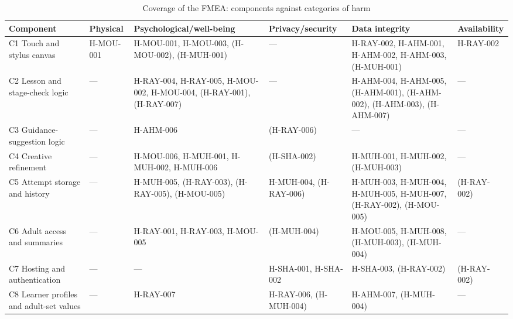 \documentclass{article}
\begin{document}
\begin{table}[htbp]
\centering
\caption{Coverage of the FMEA: components against categories of harm}
\label{tab:fmea-coverage}
\scriptsize
\setlength{\tabcolsep}{3pt}
\begin{tabularx}{\textwidth}{@{}
  >{\raggedright\arraybackslash}p{2.0cm} >{\raggedright\arraybackslash}X
  >{\raggedright\arraybackslash}X >{\raggedright\arraybackslash}X
  >{\raggedright\arraybackslash}X >{\raggedright\arraybackslash}X@{}}
\toprule
\textbf{Component} & \textbf{Physical} &
\textbf{Psycho\-logical/\allowbreak{}well-being} &
\textbf{Privacy/\allowbreak{}security} & \textbf{Data integrity} &
\textbf{Avail\-ability} \\
\midrule
C1 Touch and stylus canvas & H-MOU-001 & H-MOU-001, H-MOU-003, (H-MOU-002),
(H-MUH-001) & --- & H-RAY-002, H-AHM-001, H-AHM-002, H-AHM-003, (H-MUH-001) &
H-RAY-002 \\
\addlinespace
C2 Lesson and stage-check logic & --- & H-RAY-004, H-RAY-005, H-MOU-002,
H-MOU-004, (H-RAY-001), (H-RAY-007) & --- & H-AHM-004, H-AHM-005, (H-AHM-001),
(H-AHM-002), (H-AHM-003), (H-AHM-007) & --- \\
\addlinespace
C3 Guidance-\allowbreak{}suggestion logic & --- & H-AHM-006 & (H-RAY-006) & ---
& --- \\
\addlinespace
C4 Creative refinement & --- & H-MOU-006, H-MUH-001, H-MUH-002, H-MUH-006 &
(H-SHA-002) & H-MUH-001, H-MUH-002, (H-MUH-003) & --- \\
\addlinespace
C5 Attempt storage and history & --- & H-MUH-005, (H-RAY-003), (H-RAY-005),
(H-MOU-005) & H-MUH-004, (H-RAY-006) & H-MUH-003, H-MUH-004, H-MUH-005,
H-MUH-007, (H-RAY-002), (H-MOU-005) & (H-RAY-002) \\
\addlinespace
C6 Adult access and summaries & --- & H-RAY-001, H-RAY-003, H-MOU-005 &
(H-MUH-004) & H-MOU-005, H-MUH-008, (H-MUH-003), (H-MUH-004) & --- \\
\addlinespace
C7 Hosting and authentication & --- & --- & H-SHA-001, H-SHA-002 & H-SHA-003,
(H-RAY-002) & (H-RAY-002) \\
\addlinespace
C8 Learner profiles and adult-set values & --- & H-RAY-007 & H-RAY-006,
(H-MUH-004) & H-AHM-007, (H-MUH-004) & --- \\
\bottomrule
\end{tabularx}
\end{table}
\end{document}
